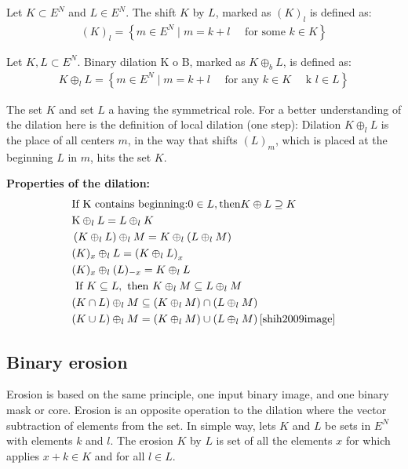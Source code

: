 Let $K \subset E^N$ and $L \in E^N$. The shift $K$ by $L$, marked as $(K)_l$ is defined as: \cite{shih2009image} \cite{haralick1987image}
\begin{align}
    (K)_{l}=\left\{m \in E^{N} \mid m=k+l \quad \text { for some } k \in K\right\}
\end{align}

Let $K, L \subset E^N$. Binary dilation K o B, marked as $K \oplus_b L$, is defined as: \cite{shih2009image} \cite{haralick1987image}
\begin{align}
    K \oplus_{l} L=\left\{m \in E^{N} \mid m=k+l \quad \text { for any } k \in K \quad \text { k } l \in L\right\}
\end{align}

The set $K$ and set $L$ a having the symmetrical role. For a better understanding of the dilation here is the definition of local dilation (one step): Dilation $K \oplus_l L$ is the place of all centers $m$, in the way that shifts $(L)_m$, which is placed at the beginning $L$ in $m$, hits the set $K$.\cite{shih2009image}

\textbf{Properties of the dilation:}
\begin{align}
    &\text{If K contains beginning:} 0 \in L, \text{then} K \oplus L \supseteq K\\
    &\mathrm{K} \oplus_{l} L=L \oplus_{l} K\\
    &\left(K \oplus_{l} L\right) \oplus_{l} M=K \oplus_{l}\left(L \oplus_{l} M\right)\\
    &(K)_{x} \oplus_{l} L=\left(K \oplus_{l} L\right)_{x}\\
    &(K)_{x} \oplus_{l}(L)_{-x}=K \oplus_{l} L\\
    &\text { If } K \subseteq L, \text { then } K \oplus_{l} M \subseteq L \oplus_{l} M\\
    &(K \cap L) \oplus_{l} M \subseteq\left(K \oplus_{l} M\right) \cap\left(L \oplus_{l} M\right)\\
    &(K \cup L) \oplus_{l} M=\left(K \oplus_{l} M\right) \cup\left(L \oplus_{l} M\right)
    \cite{shih2009image}
\end{align}

\subsection{Binary erosion}
Erosion is based on the same principle, one input binary image, and one binary mask or core. Erosion is an opposite operation to the dilation where the vector subtraction of elements from the set. In simple way, lets $K$ and $L$ be sets in $E^N$ with elements $k$ and $l$. The erosion $K$ by $L$ is set of all the elements $x$ for which applies $x + k \in K$ and for all $l \in L$.\cite{shih2009image}

